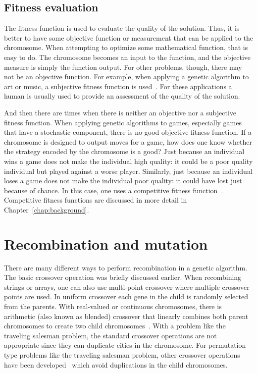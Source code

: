 \subsection{Fitness evaluation}

The fitness function is used to evaluate the quality of the solution. Thus, it
is better to have some objective function or measurement that can be applied to
the chromosome. When attempting to optimize some mathematical function, that is
easy to do. The chromosome becomes an input to the function, and the objective
measure is simply the function output. For other problems, though, there may not
be an objective function. For example, when applying a genetic algorithm to art
or music, a subjective fitness function is used~\cite{eiben2003introduction}.
For these applications a human is usually used to provide an assessment of the
quality of the solution.

And then there are times when there is neither an objective nor a subjective
fitness function. When applying genetic algorithms to games, especially games
that have a stochastic component, there is no good objective fitness function.
If a chromosome is designed to output moves for a game, how does one know
whether the strategy encoded by the chromosome is a good? Just because an
individual wins a game does not make the individual high quality: it could be a
poor quality individual but played against a worse player. Similarly, just
because an individual loses a game does not make the individual poor quality: it
could have lost just because of chance. In this case, one uses a competitive
fitness function~\cite{fogel1999intelligence}. Competitive fitness 
functions are discussed in more detail in Chapter~\ref{chap:background}.

\section{Recombination and mutation} \label{2-recombination}

There are many different ways to perform recombination in a genetic algorithm.
The basic crossover operation was briefly discussed earlier. When recombining
strings or arrays, one can also use multi-point crossover where multiple
crossover points are used. In uniform crossover each gene in the child is
randomly selected from the parents. With real-valued or continuous chromosomes,
there is arithmetic (also known as blended) crossover that linearly combines
both parent chromosomes to create two child
chromosomes~\cite{haupt2004practical}. With a problem like the traveling
salesman problem, the standard crossover operations are not appropriate since
they can duplicate cities in the chromosome. For permutation type problems like
the traveling salesman problem, other crossover operations have been
developed~\cite{goldberg1989genetic} which avoid duplications in the child
chromosomes.
